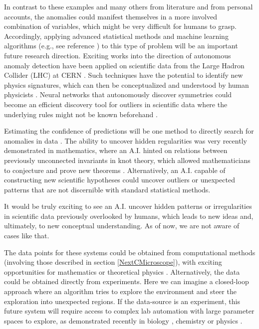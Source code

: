 In contrast to these examples and many others from literature and from personal accounts, the anomalies could manifest themselves in a more involved combination of variables, which might be very difficult for humans to grasp. Accordingly, applying advanced statistical methods and machine learning algorithms (e.g., see reference \cite{malhotra2015long}) to this type of problem will be an important future research direction. Exciting works into the direction of autonomous anomaly detection have been applied on scientific data from the Large Hadron Collider (LHC) at CERN \cite{aad2020dijet, tonon2021probing, park2021quasi}. Such techniques have the potential to identify new physics signatures, which can then be conceptualized and understood by human physicists \cite{schwartz2021modern,kasieczka2021lhc}. Neural networks that autonomously discover symmetries could become an efficient discovery tool for outliers in scientific data where the underlying rules might not be known beforehand \cite{yu2018group,dehmamy2021automatic}.

Estimating the confidence of predictions will be one method to directly search for anomalies in data \cite{nigam2021assigning}. The ability to uncover hidden regularities was very recently demonstrated in mathematics, where an A.I. hinted on relations between previously unconnected invariants in knot theory, which allowed mathematicians to conjecture and prove new theorems \cite{davies2021advancing}. Alternatively, an A.I. capable of constructing new scientific hypotheses could uncover outliers or unexpected patterns that are not discernible with standard statistical methods. 

It would be truly exciting to see an A.I. uncover hidden patterns or irregularities in scientific data previously overlooked by humans, which leads to new ideas and, ultimately, to new conceptual understanding. As of now, we are not aware of cases like that.


The data points for these systems could be obtained from computational methods (involving those described in section \ref{NextCMicroscope}), with exciting opportunities for mathematics or theoretical physics \cite{douglas2022machine}. Alternatively, the data could be obtained directly from experiments. Here we can imagine a closed-loop approach where an algorithm tries to explore the environment and steer the exploration into unexpected regions. If the data-source is an experiment, this future system will require access to complex lab automation with large parameter spaces to explore, as demonstrated recently in biology \cite{king2009automation}, chemistry \cite{bedard2018reconfigurable, steiner2019organic, coley2019robotic, burger2020mobile, chatterjee2020automated, grizou2020curious} or physics \cite{moon2020machine,dalgaard2020global}.

